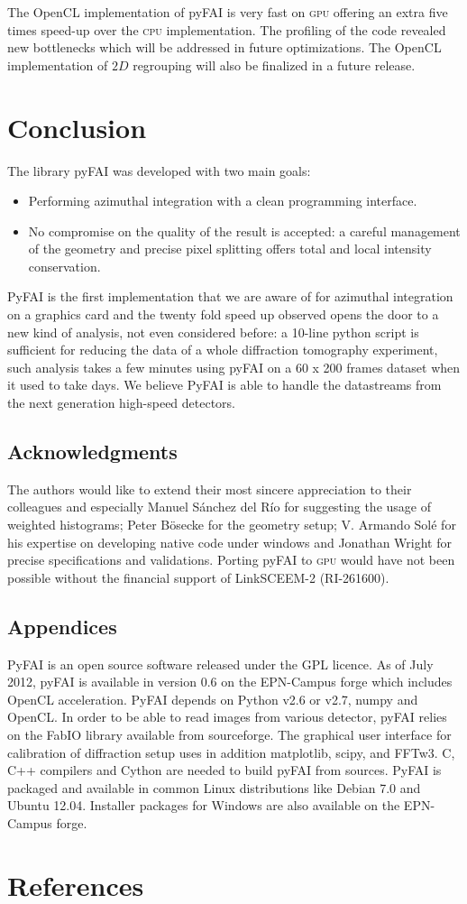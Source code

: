 \documentclass[a4paper]{jpconf}
\begin{document}
The OpenCL implementation of pyFAI is very fast on \textsc{gpu} offering an extra five
times speed-up over the \textsc{cpu} implementation. The profiling of the code revealed new
bottlenecks which will be addressed in future optimizations. The OpenCL
implementation of $2D$ regrouping will also be finalized in a future release.

\section{Conclusion}
The library pyFAI was developed with two main goals:
\begin{itemize}
\item Performing azimuthal integration with a clean programming interface.
\item No compromise on the quality of the result is accepted: a careful
management of the geometry and precise pixel splitting offers total and local intensity
conservation.
\end{itemize}
PyFAI is the first implementation that we are aware of for azimuthal integration on
a graphics card and the twenty fold speed up observed opens the
door to a new kind of analysis, not even considered before:
a 10-line python script is sufficient for reducing the data of a whole diffraction
tomography experiment, such analysis takes a few minutes using pyFAI on
a 60 x 200 frames dataset when it used to take days.
We believe PyFAI is able to handle the datastreams from the next generation high-speed detectors.

\subsection*{Acknowledgments}
The authors would like to extend their most sincere appreciation to their
colleagues and especially Manuel S\'anchez del R\'io for suggesting
the usage of weighted histograms; Peter B\"osecke for the geometry setup;
V. Armando Sol\'e for his expertise on developing native code under windows and
Jonathan Wright for precise specifications and validations. Porting
pyFAI to \textsc{gpu} would have not been possible without the financial
support of LinkSCEEM-2 (RI-261600).

\subsection*{Appendices}
PyFAI is an open source software released under the GPL licence.
As of July 2012, pyFAI is available in version 0.6 on the EPN-Campus
forge\cite{forge} which includes OpenCL acceleration.
PyFAI depends on Python v2.6 or v2.7, numpy\cite{numpy} and OpenCL\cite{opencl}.
In order to be able to read images from various detector, pyFAI relies on the
FabIO\cite{fabio} library available from sourceforge. The graphical user
interface for calibration of diffraction setup uses in addition
matplotlib\cite{matplotlib}, scipy\cite{scipy}, and FFTw3\cite{fftw}.
C, C++ compilers and Cython\cite{cython} are needed to build pyFAI from
sources.
PyFAI is packaged and available in common Linux distributions like Debian
7.0 and Ubuntu 12.04. Installer packages for Windows are also
available on the EPN-Campus forge.

\section*{References}


\end{document}
